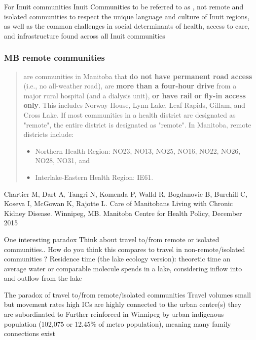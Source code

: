 \documentclass[aspectratio=169]{beamer}\usepackage[]{graphicx}\usepackage[]{xcolor}
\begin{document}
\begin{frame}{For Inuit communities}
	Inuit Communities to be referred to as , not remote and isolated communities to respect the unique language and culture of Inuit regions, as well as the common challenges in social determinants of health, access to care, and infrastructure found across all Inuit communities
\end{frame}

\begin{frame}\frametitle{MB remote communities}
	\begin{quote}
	 are communities in Manitoba that \textbf{do not have permanent road access} (i.e., no all-weather road), are \textbf{more than a four-hour drive} from a major rural hospital (and a dialysis unit), \textbf{or have rail or fly-in access only}. This includes Norway House, Lynn Lake, Leaf Rapids, Gillam, and Cross Lake. If most communities in a health district are designated as "remote", the entire district is designated as "remote". In Manitoba, remote districts include:
	\begin{itemize}
	\item Northern Health Region: NO23, NO13, NO25, NO16, NO22, NO26, NO28, NO31, and
	\item Interlake-Eastern Health Region: IE61.
	\end{itemize}
	\end{quote}
	\vfill
	\small
	Chartier M, Dart A, Tangri N, Komenda P, Walld R, Bogdanovic B, Burchill C, Koseva I, McGowan K, Rajotte L. Care of Manitobans Living with Chronic Kidney Disease. Winnipeg, MB.
	Manitoba Centre for Health Policy, December 2015
\end{frame}


\begin{frame}{One interesting paradox}
	Think about travel to/from remote or isolated communities..
	\vfill
	How do you think this compares to travel in non-remote/isolated communities ?
	\vfill
	Residence time (the lake ecology version): theoretic time an average water or comparable molecule spends in a lake, considering inflow into and outflow from the lake
\end{frame}

\begin{frame}{The paradox of travel to/from remote/isolated communities}
Travel volumes small but movement rates high
\vfill
ICs are highly connected to the urban centre(s) they are subordinated to
\vfill
Further reinforced in Winnipeg by urban indigenous population (102,075 or 12.45\% of metro population), meaning many family connections exist
\end{frame}
\end{document}

